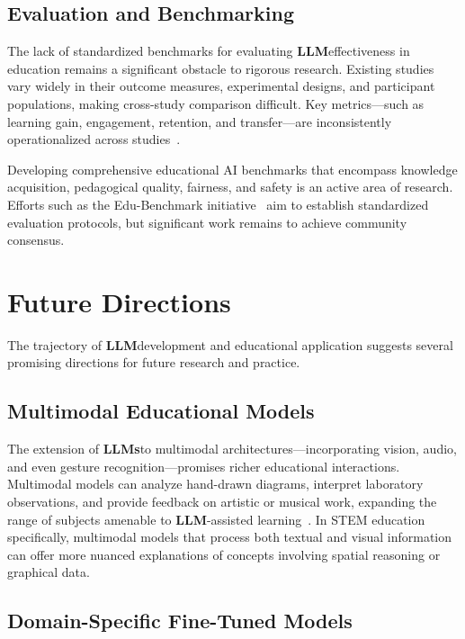 \documentclass[preprint,12pt]{article}
\newcommand{\LLM}{\textbf{LLM}}
\newcommand{\LLMs}{\textbf{LLMs}}
\theoremstyle{mystyle}
\begin{document}
\subsection{Evaluation and Benchmarking}
\label{sec:evaluation}

The lack of standardized benchmarks for evaluating \LLM effectiveness in education remains a significant obstacle to rigorous research. Existing studies vary widely in their outcome measures, experimental designs, and participant populations, making cross-study comparison difficult. Key metrics---such as learning gain, engagement, retention, and transfer---are inconsistently operationalized across studies~\citep{arslan2024large}.

Developing comprehensive educational AI benchmarks that encompass knowledge acquisition, pedagogical quality, fairness, and safety is an active area of research. Efforts such as the Edu-Benchmark initiative~\citep{edubench2025} aim to establish standardized evaluation protocols, but significant work remains to achieve community consensus.

\section{Future Directions}
\label{sec:future}

The trajectory of \LLM development and educational application suggests several promising directions for future research and practice.

\subsection{Multimodal Educational Models}
\label{sec:multimodal}

The extension of \LLMs to multimodal architectures---incorporating vision, audio, and even gesture recognition---promises richer educational interactions. Multimodal models can analyze hand-drawn diagrams, interpret laboratory observations, and provide feedback on artistic or musical work, expanding the range of subjects amenable to \LLM-assisted learning~\citep{gemini2024gemini}. In STEM education specifically, multimodal models that process both textual and visual information can offer more nuanced explanations of concepts involving spatial reasoning or graphical data.

\subsection{Domain-Specific Fine-Tuned Models}
\label{sec:finetuning}
\end{document}
